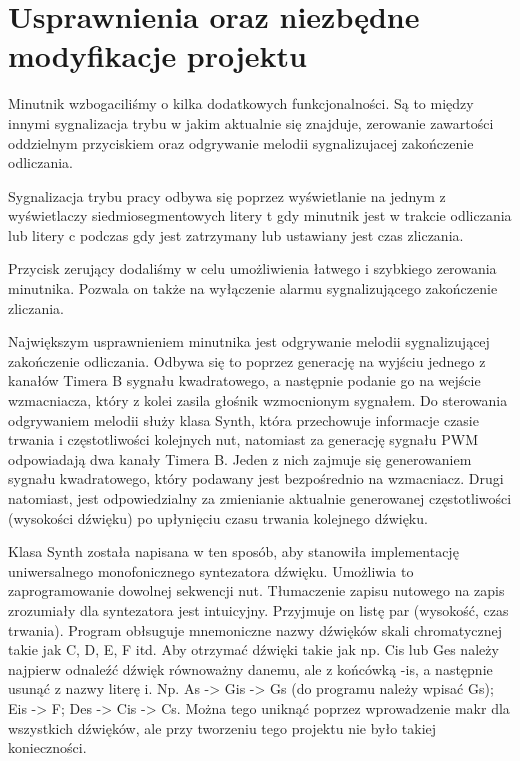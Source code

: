 \documentclass[fleqn]{article}
\begin{document}


\section{Usprawnienia oraz niezbędne modyfikacje projektu}

Minutnik wzbogaciliśmy o kilka dodatkowych funkcjonalności. Są to między innymi sygnalizacja trybu w jakim aktualnie się znajduje, zerowanie zawartości oddzielnym przyciskiem oraz odgrywanie melodii sygnalizujacej zakończenie odliczania.

Sygnalizacja trybu pracy odbywa się poprzez wyświetlanie na jednym z wyświetlaczy siedmiosegmentowych litery t gdy minutnik jest w trakcie odliczania lub litery c podczas gdy jest zatrzymany lub ustawiany jest czas zliczania.

Przycisk zerujący dodaliśmy w celu umożliwienia łatwego i szybkiego zerowania minutnika. Pozwala on także na wyłączenie alarmu sygnalizującego zakończenie zliczania.

Największym usprawnieniem minutnika jest odgrywanie melodii sygnalizującej zakończenie odliczania. Odbywa się to poprzez generację na wyjściu jednego z kanałów Timera B sygnału kwadratowego, a następnie podanie go na wejście wzmacniacza, który z kolei zasila głośnik wzmocnionym sygnałem. Do sterowania odgrywaniem melodii służy klasa Synth, która przechowuje informacje czasie trwania i częstotliwości kolejnych nut, natomiast za generację sygnału PWM odpowiadają dwa kanały Timera B. Jeden z nich zajmuje się generowaniem sygnału kwadratowego, który podawany jest bezpośrednio na wzmacniacz. Drugi natomiast, jest odpowiedzialny za zmienianie aktualnie generowanej częstotliwości (wysokości dźwięku) po upłynięciu czasu trwania kolejnego dźwięku.

Klasa Synth została napisana w ten sposób, aby stanowiła implementację uniwersalnego monofonicznego syntezatora dźwięku. Umożliwia to zaprogramowanie dowolnej sekwencji nut. Tłumaczenie zapisu nutowego na zapis zrozumiały dla syntezatora jest intuicyjny. Przyjmuje on listę par (wysokość, czas trwania). Program obłsuguje mnemoniczne nazwy dźwięków skali chromatycznej takie jak C, D, E, F itd. Aby otrzymać dźwięki takie jak np. Cis lub Ges należy najpierw odnaleźć dźwięk równoważny danemu, ale z końcówką -is, a następnie usunąć z nazwy literę i. Np. As -> Gis -> Gs (do programu należy wpisać Gs); Eis -> F; Des -> Cis -> Cs. Można tego uniknąć poprzez wprowadzenie makr dla wszystkich dźwięków, ale przy tworzeniu tego projektu nie było takiej konieczności.
\end{document}
